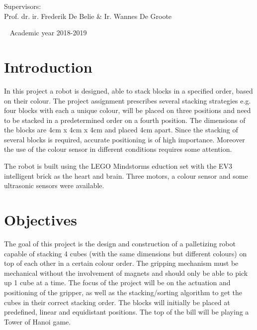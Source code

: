 \documentclass{article}
\begin{document}
\begin{titlepage}
\begin{center}
			\vspace*{0.5 cm}
			\Large Supervisors: \\ Prof. dr. ir. Frederik De Belie \& Ir. Wannes De Groote\\ 
			
		\end{center} ~		
		\vfill
		{\Large Academic year 2018-2019}\\[2 cm]
		
		\vfill
		
	\end{titlepage}
	
	\tableofcontents
	\pagebreak
	
	\section{Introduction}
	\par In this project a robot is designed, able to stack blocks in a specified order, based on their colour. The project assignment prescribes several stacking strategies e.g. four blocks with each a unique colour, will be placed on three positions and need to be stacked in a predetermined order on a fourth position. The dimensions of the blocks are 4cm x 4cm x 4cm and placed 4cm apart. Since the stacking of several blocks is required, accurate positioning is of high importance. Moreover the use of the colour sensor in different conditions requires some attention.
	\par The robot is built using the LEGO Mindstorms eduction set with the EV3 intelligent brick as the heart and brain. Three motors, a colour sensor and some ultrasonic sensors were available. 
	
	\section{Objectives}
	\par The goal of this project is the design and construction of a palletizing robot capable of stacking
	4 cubes (with the same dimensions but different colours) on top of each other in a certain
	colour order. The gripping mechanism must be mechanical without the involvement of magnets
	and should only be able to pick up 1 cube at a time. The focus of the project will be on
	the actuation and positioning of the gripper, as well as the stacking/sorting algorithm to get
	the cubes in their correct stacking order. The blocks will initially be placed at predefined, linear
	and equidistant positions. The top of the bill will be playing a Tower of Hanoi game.
	
\end{document}
